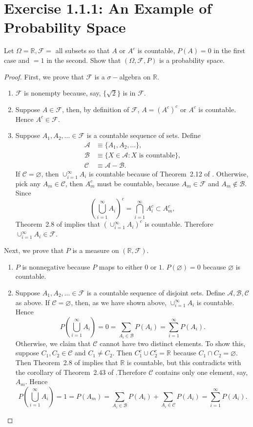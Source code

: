 \documentclass{amsbook}
\theoremstyle{definition}
\theoremstyle{remark}
\numberwithin{section}{chapter}
\numberwithin{equation}{chapter}
\begin{document}
\section{Exercise 1.1.1: An Example of Probability Space}
Let $\Omega=\mathbb{R},\mathcal{F}=$ all subsets so that $A$ or $A^c$ is countable, $P(A)=0$ in the first case and $=1$ in the second. Show that $(\Omega,\mathcal{F},P)$ is a probability space.
\begin{proof}
First, we prove that $\mathcal F$ is a $\sigma-$algebra on $\mathbb{R}$.
\begin{enumerate}
\item $\mathcal F$ is nonempty because, say, $\{\sqrt{2}\}$ is in $\mathcal F$.
\item Suppose $A\in\mathcal F$, then, by definition of $\mathcal F$, $A=(A^c)^c$ or $A^c$ is countable. Hence $A^c\in\mathcal F$.
\item Suppose $A_1,A_2,\dots\in\mathcal{F}$ is a countable sequence of sets. Define\[
\begin{split}
\mathcal{A}&\equiv\{A_1,A_2,\dots\},\\
\mathcal{B}&\equiv\{X\in\mathcal{A}:X\text{ is countable}\},\\
\mathcal{C}&\equiv\mathcal{A}-\mathcal{B}.
\end{split}
\]If $\mathcal{C}=\varnothing$, then $\cup_{i=1}^\infty A_i$ is countable because of Theorem~2.12 of \cite{rudin1976principles}. Otherwise, pick any $A_m\in\mathcal{C}$, then $A_m^c$ must be countable, because $A_m\in\mathcal{F}$ and $A_m\notin\mathcal{B}$. Since\[
\left(\bigcup_{i=1}^\infty A_i\right)^c=\bigcap_{i=1}^\infty A_i^c\subset A_m^c,
\]Theorem~2.8 of \cite{rudin1976principles} implies that $(\cup_{i=1}^\infty A_i)^c$ is countable. Therefore $\cup_{i=1}^\infty A_i\in\mathcal F$.
\end{enumerate}

Next, we prove that $P$ is a measure on $(\mathbb{R},\mathcal{F})$.
\begin{enumerate}
\item $P$ is nonnegative because $P$ maps to either $0$ or $1$. $P(\varnothing)=0$ because $\varnothing$ is countable.
\item Suppose $A_1,A_2,\dots\in\mathcal{F}$ is a countable sequence of disjoint sets. Define $\mathcal{A}, \mathcal{B}, \mathcal{C}$ as above. If $\mathcal{C}=\varnothing$, then, as we have shown above, $\cup_{i=1}^\infty A_i$ is countable. Hence\[
P\left(\bigcup_{i=1}^\infty A_i\right)=0=\sum_{A_i\in\mathcal{B}} P(A_i)=\sum_{i=1}^\infty P(A_i).
\]Otherwise, we claim that $\mathcal{C}$ cannot have two distinct elements. To show this, suppose $C_1,C_2\in\mathcal{C}$ and $C_1\ne C_2$. Then $C_1^c\cup C_2^c=\mathbb{R}$ because $C_1\cap C_2=\varnothing$. Then Theorem~2.8 of \cite{rudin1976principles} implies that $\mathbb{R}$ is countable, but this contradicts with the corollary of Theorem~2.43 of \cite{rudin1976principles}.Therefore $\mathcal{C}$ contains only one element, say, $A_m$. Hence\[
P\left(\bigcup_{i=1}^\infty A_i\right)=1=P(A_m)=\sum_{A_i\in\mathcal{B}} P(A_i)+\sum_{A_i\in\mathcal{C}} P(A_i)=\sum_{i=1}^\infty P(A_i).
\]
\end{enumerate}


\end{proof}
\end{document}

